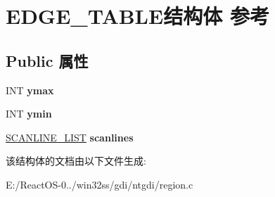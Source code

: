 \hypertarget{struct_e_d_g_e___t_a_b_l_e}{}\section{E\+D\+G\+E\+\_\+\+T\+A\+B\+L\+E结构体 参考}
\label{struct_e_d_g_e___t_a_b_l_e}
\subsection*{Public 属性}
\begin{DoxyCompactItemize}
\item 
\mbox{\label{struct_e_d_g_e___t_a_b_l_e_a52b3cf82692a711b9113cd3105485e59}} 
I\+NT {\bfseries ymax}
\item 
\mbox{\label{struct_e_d_g_e___t_a_b_l_e_a47ad624fc3608f22b67f0603a453dc02}} 
I\+NT {\bfseries ymin}
\item 
\mbox{\label{struct_e_d_g_e___t_a_b_l_e_ad86c9eaa5784a3636463c586046e12cd}} 
\hyperlink{struct___s_c_a_n_l_i_n_e___l_i_s_t}{S\+C\+A\+N\+L\+I\+N\+E\+\_\+\+L\+I\+ST} {\bfseries scanlines}
\end{DoxyCompactItemize}


该结构体的文档由以下文件生成\+:\begin{DoxyCompactItemize}
\item 
E\+:/\+React\+O\+S-\/0../win32ss/gdi/ntgdi/region.\+c\end{DoxyCompactItemize}
